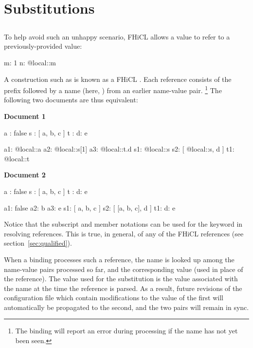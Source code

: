 \documentclass{memarticle}
\makeatletter
\newcommand{\fhicl}{FHiCL\xspace}
\newcommand{\atlocal}{\fclcode{@local::}\xspace}
\makeatother
\begin{document}
\section{Substitutions}

\subsection{\atlocal}

To help avoid such an unhappy scenario, \fhicl allows a value to refer
to a previously-provided value:
%
\Needspace{0.34in}
\begin{fcllisting}[texcl,escapechar=`]
m: 1
n: @local::m
\end{fcllisting}
%
A construction such as  is known as a \fhicl
{}.  Each reference consists of the prefix \atlocal
followed by a name (here, ) from an earlier name-value
pair.%
\footnote{%
  The binding will report an error during processing if the name
  has not yet been seen.%
}
The following two documents are thus equivalent:

\begin{minipage}{0.48\textwidth}
\centering\textbf{Document 1}
  \begin{fcllisting}[texcl,escapechar=`]
a : false
s : [ a, b, c ]
t : { d: e }

a1: @local::a
a2: @local::s[1]
a3: @local::t.d
s1: @local::s
s2: [ @local::s, d ]
t1: @local::t
  \end{fcllisting}
\end{minipage}\hfill
\begin{minipage}{0.48\textwidth}
\centering\textbf{Document 2}
  \begin{fcllisting}[texcl,escapechar=`]
a : false
s : [ a, b, c ]
t : { d: e }

a1: false
a2: b
a3: e
s1: [ a, b, c ]
s2: [ [a, b, c], d ]
t1: { d: e }
  \end{fcllisting}
\end{minipage}

Notice that the subscript and member notations can be used for the
\atlocal keyword in resolving references.  This is true, in general,
of any of the FHiCL references (see section~\ref{sec:qualified}).

When a binding processes such a reference, the name is looked up among
the name-value pairs processed so far, and the corresponding value
 (used in place of the reference).  The value used
for the substitution is the value associated with the name at the time
the reference is parsed.  As a result, future revisions of the
configuration file which contain modifications to the value of the
first will automatically be propagated to the second, and the two
pairs will remain in sync.
\end{document}
